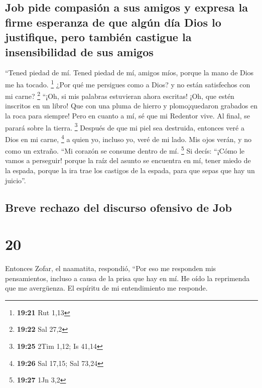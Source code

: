 \hypertarget{job-pide-compasiuxf3n-a-sus-amigos-y-expresa-la-firme-esperanza-de-que-alguxfan-duxeda-dios-lo-justifique-pero-tambiuxe9n-castigue-la-insensibilidad-de-sus-amigos}{%
\subsection{Job pide compasión a sus amigos y expresa la firme esperanza
de que algún día Dios lo justifique, pero también castigue la
insensibilidad de sus
amigos}\label{job-pide-compasiuxf3n-a-sus-amigos-y-expresa-la-firme-esperanza-de-que-alguxfan-duxeda-dios-lo-justifique-pero-tambiuxe9n-castigue-la-insensibilidad-de-sus-amigos}}

 ``Tened piedad de mí. Tened piedad de mí, amigos míos,
porque la mano de Dios me ha tocado. \footnote{\textbf{19:21} Rut 1,13}
 ¿Por qué me persigues como a Dios? y no están
satisfechos con mi carne? \footnote{\textbf{19:22} Sal 27,2}
 ``¡Oh, si mis palabras estuvieran ahora escritas! ¡Oh,
que estén inscritos en un libro!  Que con una pluma de
hierro y plomo¡quedaron grabados en la roca para siempre!
 Pero en cuanto a mí, sé que mi Redentor vive. Al final,
se parará sobre la tierra. \footnote{\textbf{19:25} 2Tim 1,12; Is 41,14}
 Después de que mi piel sea destruida, entonces veré a
Dios en mi carne, \footnote{\textbf{19:26} Sal 17,15; Sal 73,24}
 a quien yo, incluso yo, veré de mi lado. Mis ojos verán,
y no como un extraño. ``Mi corazón se consume dentro de mí. \footnote{\textbf{19:27}
  1Jn 3,2}  Si decís: ``¡Cómo le vamos a perseguir!
porque la raíz del asunto se encuentra en mí,  tener
miedo de la espada, porque la ira trae los castigos de la espada, para
que sepas que hay un juicio''.

\hypertarget{breve-rechazo-del-discurso-ofensivo-de-job}{%
\subsection{Breve rechazo del discurso ofensivo de
Job}\label{breve-rechazo-del-discurso-ofensivo-de-job}}

\hypertarget{section-19}{%
\section{20}\label{section-19}}

 Entonces Zofar, el naamatita, respondió, 
``Por eso me responden mis pensamientos, incluso a causa de la prisa que
hay en mí.  He oído la reprimenda que me avergüenza. El
espíritu de mi entendimiento me responde.

